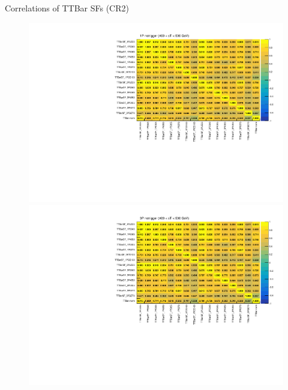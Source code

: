 \documentclass[aspectratio=46, dvipdfmx, 10pt, t]{beamer} %
\begin{document}
\begin{frame}{Correlations of TTBar SFs (CR2)}
  \vspace{15mm}
  \begin{figure}
    \setcounter{subfigure}{0}
    \centering
        \includegraphics[scale=0.29]{correlation_sf_1P_notrigger_CR2_stGE400LT500}
        \includegraphics[scale=0.29]{correlation_sf_3P_notrigger_CR2_stGE400LT500}
  \end{figure}
\end{frame}
\end{document}
